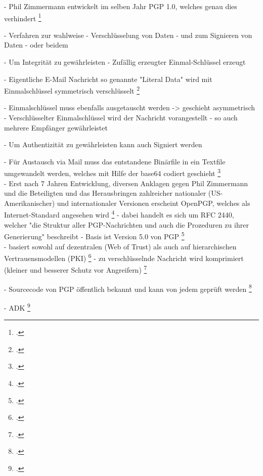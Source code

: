 \documentclass  [paper=a4,
				fontsize=12pt,
				listof=totoc,
				bibliography=totoc
				]{scrreprt}
\begin{document}
				- Phil Zimmermann entwickelt im selben Jahr PGP 1.0, welches genau dies verhindert 
				\footcite[][S. 29]{Schwenk}
				
				- Verfahren zur wahlweise
				- Verschlüsselung von Daten
				- und zum Signieren von Daten
				- oder beidem
				
				
				- Um Integrität zu gewährleisten
				- Zufällig erzeugter Einmal-Schlüssel erzeugt
				
				- Eigentliche E-Mail Nachricht so genannte "Literal Data" wird mit Einmalschlüssel symmetrisch verschlüsselt
				\footcite[][S. 43]{Schwenk}
				
				- Einmalschlüssel muss ebenfalls ausgetauscht werden -> geschieht asymmetrisch
				- Verschlüsselter Einmalschlüssel wird der Nachricht vorangestellt
				- so auch mehrere Empfänger gewährleistet
				
				
				- Um Authentizität zu gewährleisten kann auch Signiert werden
				
				- Für Austausch via Mail muss das entstandene Binärfile in ein Textfile umgewandelt werden, welches mit Hilfe der base64 codiert geschieht
				\footcite[][S. 47]{Schwenk}			
				\medskip\\
				
						
				- Erst nach 7 Jahren Entwicklung, diversen Anklagen gegen Phil Zimmermann und die Beteiligten und das Herausbringen zahlreicher nationaler (US-Amerikanischer) und internationaler Versionen erscheint OpenPGP, welches als Internet-Standard angesehen wird
				\footcite[][S. 29-35]{Schwenk}
				- dabei handelt es sich um RFC 2440, welcher "die Struktur aller PGP-Nachrichten und auch die Prozeduren zu ihrer Generierung" beschreibt
				- Basis ist Version 5.0 von PGP
				\footcite[][S. 42]{Schwenk}
				\medskip\\
				
										
				- basiert sowohl auf dezentralen (Web of Trust) als auch auf hierarchischen Vertrauensmodellen (PKI)
				\footcite[][S. 38f.]{Schwenk} 
				- zu verschlüsselnde Nachricht wird komprimiert (kleiner und besserer Schutz vor Angreifern)
				\footcite[][S. 45]{Schwenk}	
				
				- Sourcecode von PGP öffentlich bekannt und kann von jedem geprüft werden
				\footcite[][S. 47]{Schwenk}			
				
				- ADK
				\footcite[][S. 32]{Schwenk}
				\medskip\\
				
\end{document}
